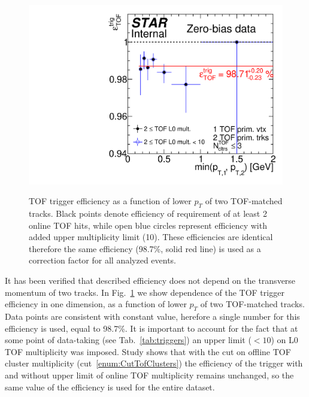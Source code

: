\begin{figure}[ht!]
\centering%
\parbox{0.4725\textwidth}{%
  \centering%
  \includegraphics[width=\linewidth]{graphics/corrections/TofTrigEff_Final.pdf}\label{fig:tofTrigEff} 
}%
\quad%
\parbox{0.4725\textwidth}{%
    \caption[TOF trigger efficiency as a function of lower $p_{T}$ of two TOF-matched tracks.]{TOF trigger efficiency as a function of lower $p_{T}$ of two TOF-matched tracks. Black points denote efficiency of requirement of at least 2 online TOF hits, while open blue circles represent efficiency with added upper multiplicity limit (10). These efficiencies are identical therefore the same efficiency (98.7\%, solid red line) is used as a correction factor for all analyzed events.}\label{fig:tofTrigEff2}%
}
\end{figure}

It has been verified that described efficiency does not depend on the transverse momentum of two tracks. In Fig.~\ref{fig:tofTrigEff2} we show dependence of the TOF trigger efficiency in one dimension, as a function of lower $p_{T}$ of two TOF-matched tracks. Data points are consistent with constant value, herefore a single number for this efficiency is used, equal to 98.7\%. It is important to account for the fact that at some point of data-taking (see Tab.~\ref{tab:triggers}) an upper limit ($<10$) on L0 TOF multiplicity was imposed. Study shows that with the cut on offline TOF cluster multiplicity (cut~\ref{enum:CutTofClusters}) the efficiency of the trigger with and without upper limit of online TOF multiplicity remains unchanged, so the same value of the efficiency is used for the entire dataset.



